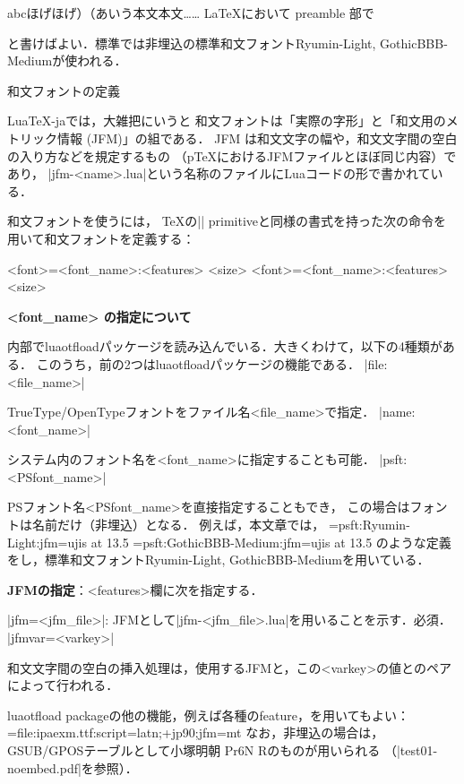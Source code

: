 \rm\tenipam abcほげほげ）（あいう本文本文……
\endtt
\LaTeX において preamble 部で
\begintt
\usepackage{luatexja}
\endtt
と書けばよい．標準では非埋込の標準和文フォントRyumin-Light, GothicBBB-Mediumが使われる．

\beginparagraph 和文フォントの定義

Lua\TeX-jaでは，大雑把にいうと
和文フォントは「実際の字形」と「和文用のメトリック情報 (JFM)」の組である．
JFM は和文文字の幅や，和文文字間の空白の入り方などを規定するもの%
{\small （p\TeX におけるJFMファイルとほぼ同じ内容）}であり，
|jfm-<name>.lua|という名称のファイルにLuaコードの形で書かれている．

和文フォントを使うには，
\TeX の|\font| primitiveと同様の書式を持った次の命令を用いて和文フォントを定義する：

\begintt
  \jfont<font>={<font_name>:<features>} <size>       %
  \globaljfont<font>={<font_name>:<features>} <size> %
\endtt

\item {\bf <font_name> の指定について}\par\noindent
内部でluaotfloadパッケージを読み込んでいる．大きくわけて，以下の4種類がある．
このうち，前の2つはluaotfloadパッケージの機能である．
\itemitem |file:<file_name>|\par\noindent
TrueType/OpenTypeフォントをファイル名<file_name>で指定．
\itemitem |name:<font_name>|\par\noindent
システム内のフォント名を<font_name>に指定することも可能．
\itemitem |psft:<PSfont_name>|\par\noindent
PSフォント名<PSfont_name>を直接指定することもでき，
この場合はフォントは名前だけ（非埋込）となる．
例えば，本文章では，
\begintt
\jfont\tenmc={psft:Ryumin-Light:jfm=ujis} at 13.5\jQ
\jfont\tengt={psft:GothicBBB-Medium:jfm=ujis} at 13.5\jQ
\endtt
のような定義をし，標準和文フォントRyumin-Light, GothicBBB-Mediumを用いている．

\item {\bf JFMの指定}：<features>欄に次を指定する．\par\noindent
\itemitem |jfm=<jfm_file>|: JFMとして|jfm-<jfm_file>.lua|を用いることを示す．必須．
\itemitem |jfmvar=<varkey>|\par\noindent
和文文字間の空白の挿入処理は，使用するJFMと，この<varkey>の値とのペアによって行われる．

\item luaotfload packageの他の機能，例えば各種のfeature，を用いてもよい：
\begintt
\jfont\tenipam={file:ipaexm.ttf:script=latn;+jp90;jfm=mt}
\endtt
なお，非埋込の場合は，GSUB/GPOSテーブルとして小塚明朝 Pr6N Rのものが用いられる
（|test01-noembed.pdf|を参照）．
\enditem

